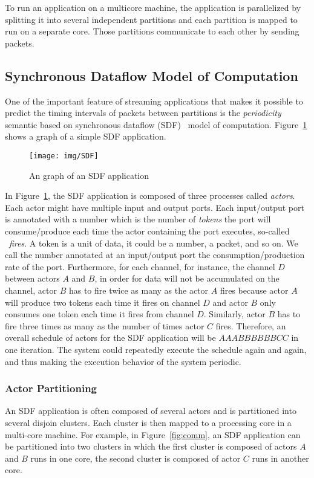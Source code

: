 \documentclass[12pt]{article}
\begin{document}
To run an application on a multicore machine, the application is
parallelized by splitting it into several independent partitions and each
partition is mapped to run on a separate core. Those partitions
communicate to each other by sending packets.

\subsection{Synchronous Dataflow Model of Computation}\label{sec:SDF}
One of the important feature of streaming applications that makes it possible to
predict the timing intervals of packets between partitions is the
\textit{periodicity} semantic based on synchronous dataflow (SDF)~\cite{LeeSDF}
model of computation. Figure~\ref{fig:SDF} shows a graph of a simple SDF
application.

\begin{figure}[ht!]
\centering
\texttt{[image: img/SDF]}
\caption{An graph of an SDF application}\label{fig:SDF}
\end{figure}

In Figure~\ref{fig:SDF}, the SDF application is composed of three processes
called \textit{actors}. Each actor might have multiple input and output ports.
Each input/output port is annotated with a number which is the number of
\textit{tokens} the port will consume/produce each time the actor containing the
port executes, so-called ~\textit{fires}. A token is a unit of data, it could be
a number, a packet, and so on. We call the number annotated at an input/output
port the consumption/production rate of the port. Furthermore, for each channel,
for instance, the channel $D$ between actors $A$ and $B$, in order for data will
not be accumulated on the channel, actor $B$ has to fire twice as many as the actor $A$
fires because actor $A$ will produce two tokens each time it fires on channel
$D$ and actor $B$ only consumes one token each time it fires from channel $D$.
Similarly, actor $B$ has to fire three times as many as the number of times actor $C$ fires. Therefore, an
overall schedule of actors for the SDF application will be $AAABBBBBBCC$ in one
iteration. The system could repeatedly execute the schedule again and again, and
thus making the execution behavior of the system periodic.

\subsubsection{Actor Partitioning}
An SDF application is often composed of several actors and is partitioned into
several disjoin clusters. Each cluster is then mapped to a processing core in a
multi-core machine. For example, in Figure~\ref{fig:comm}, an SDF application
can be partitioned into two clusters in which the first cluster is composed of
actors $A$ and $B$ runs in one core, the second cluster is composed of actor
$C$ runs in another core.
\end{document}

